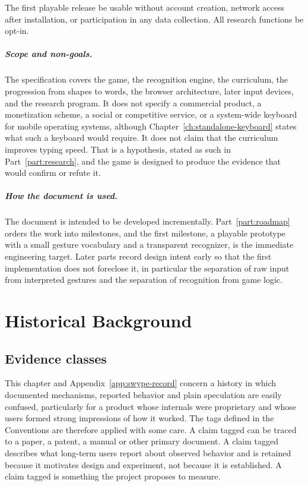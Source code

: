 \begin{requirement}\label{req:enjoyment}
The first playable release \must{} be usable without account creation, network access after installation, or participation in any data collection. All research functions \must{} be opt-in.\evS
\end{requirement}

\paragraph{Scope and non-goals.} The specification covers the game, the recognition engine, the curriculum, the progression from shapes to words, the browser architecture, later input devices, and the research program. It does not specify a commercial product, a monetization scheme, a social or competitive service, or a system-wide keyboard for mobile operating systems, although Chapter~\ref{ch:standalone-keyboard} states what such a keyboard would require. It does not claim that the curriculum improves typing speed. That is a hypothesis, stated as such in Part~\ref{part:research}, and the game is designed to produce the evidence that would confirm or refute it.

\paragraph{How the document is used.} The document is intended to be developed incrementally. Part~\ref{part:roadmap} orders the work into milestones, and the first milestone, a playable prototype with a small gesture vocabulary and a transparent recognizer, is the immediate engineering target. Later parts record design intent early so that the first implementation does not foreclose it, in particular the separation of raw input from interpreted gestures and the separation of recognition from game logic.

\chapter{Historical Background}\label{ch:history}

\section{Evidence classes}

This chapter and Appendix~\ref{app:swype-record} concern a history in which documented mechanisms, reported behavior and plain speculation are easily confused, particularly for a product whose internals were proprietary and whose users formed strong impressions of how it worked. The tags defined in the Conventions are therefore applied with some care. A claim tagged \evD{} can be traced to a paper, a patent, a manual or other primary document. A claim tagged \evO{} describes what long-term users report about observed behavior and is retained because it motivates design and experiment, not because it is established. A claim tagged \evH{} is something the project proposes to measure.

